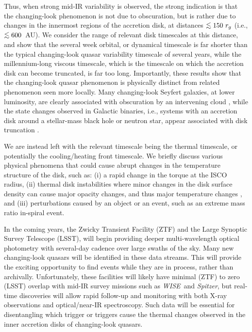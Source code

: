 \documentclass[iop]{emulateapj}
\def\ie{{i.e.}}
\def\eg{{e.g.}}
\def\wise{{\it WISE}}
\def\spitzer{{\it Spitzer}}
\def\spose#1{\hbox to 0pt{#1\hss}}
\def\simlt{\mathrel{\spose{\lower 3pt\hbox{$\mathchar"218$}}
     \raise 2.0pt\hbox{$\mathchar"13C$}}}
\begin{document}
Thus, when strong mid-IR variability is observed, the strong
indication is that the changing-look phenomenon is not due to
obscuration, but is rather due to changes in the innermost regions
of the accretion disk, at distances $\simlt 150~r_g$ (\ie, $\simlt
600$~AU).  We consider the range of relevant disk timescales at
this distance, and show that the several week orbital, or dynamical
timescale is far shorter than the typical changing-look quasar
variability timescale of several years, while the millennium-long
viscous timescale, which is the timescale on which the accretion
disk can become truncated, is far too long.  Importantly, these
results show that the changing-look quasar phenomenon is physically
distinct from related phenomenon seen more locally.  Many changing-look
Seyfert galaxies, at lower luminosity, are clearly associated with
obscuration by an intervening cloud \citep[\eg, NGC~1365;][]{Risaliti:02,
Rivers:15}, while the state changes observed in Galactic binaries,
\ie, systems with an accretion disk around a stellar-mass black
hole or neutron star, appear associated with disk truncation
\citep[\eg, GRS~1915+105;][]{Neilsen:11}.

We are instead left with the relevant timescale being the thermal
timescale, or potentially the cooling/heating front timescale.  We
briefly discuss various physical phenomena that could cause abrupt
changes in the temperature structure of the disk, such as: (i) a
rapid change in the torque at the ISCO radius, (ii) thermal disk
instabilities where minor changes in the disk surface density can
cause major opacity changes, and thus major temperature changes
\citep[\eg][]{Lightman:74, Lin:86}, and (iii) perturbations caused
by an object or an event, such as an extreme mass ratio in-spiral
event.

In the coming years, the Zwicky Transient Facility (ZTF) and the
Large Synoptic Survey Telescope (LSST), will begin providing deeper
multi-wavelength optical photometry with several-day cadence over
large swaths of the sky.  Many new changing-look quasars will be
identified in these data streams.  This will provide the exciting
opportunity to find events while they are in process, rather than
archivally.  Unfortunately, these facilities will likely have minimal
(ZTF) to zero (LSST) overlap with mid-IR survey missions such as
\wise\ and \spitzer, but real-time discoveries will allow rapid
follow-up and monitoring with both X-ray observations and optical/near-IR
spectroscopy.  Such data will be essential for disentangling which
trigger or triggers cause the thermal changes observed in the inner
accretion disks of changing-look quasars.
\end{document}
